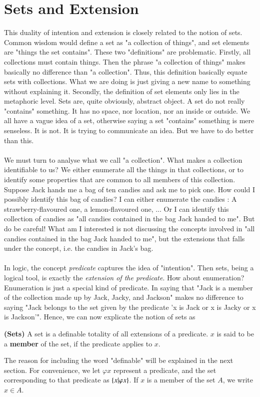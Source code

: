\section{Sets and Extension}
This duality of intention and extension is closely related to the notion of sets. Common wisdom would define a set as "a collection of things", and set elements are "things the set contains". These two "definitions" are problematic. Firstly, all collections must contain things. Then the phrase "a collection of things" makes basically no difference than "a collection". Thus, this definition basically equate sets with collections. What we are doing is just giving a new name to something without explaining it. Secondly, the definition of set elements only lies in the metaphoric level. Sets are, quite obviously, abstract object. A set do not really "contains" something. It has no space, nor location, nor an inside or outside. We all have a vague idea of a set, otherwise saying a set "contains" something is mere senseless. It is not. It is trying to communicate an idea. But we have to do better than this. \\
~\\
We must turn to analyse what we call "a collection". What makes a collection identifiable to us? We either enumerate all the things in that collections, or to identify some properties that are common to all members of this collection. Suppose Jack hands me a bag of ten candies and ask me to pick one. How could I possibly identify this bag of candies? I can either enumerate the candies : A strawberry-flavoured one, a lemon-flavoured one, ... Or I can identify this collection of candies as "all candies contained in the bag Jack handed to me". But do be careful! What am I interested is not discussing the concepts involved in "all candies contained in the bag Jack handed to me", but the extensions that falls under the concept, i.e. the candies in Jack's bag. \\
~\\
In logic, the concept \textit{predicate} captures the idea of "intention". Then sets, being a logical tool, is exactly the \textit{extension of the predicate}. How about enumeration? Enumeration is just a special kind of predicate. In saying that "Jack is a member of the collection made up by Jack, Jacky, and Jackson" makes no difference to saying "Jack belongs to the set given by the predicate 'x is Jack or x is Jacky or x is Jackson'". Hence, we can now explicate the notion of sets as
\begin{defn}
    \textbf{(Sets)} A set is a definable totality of all extensions of a predicate. $x$ is said to be a \textbf{member} of the set, if the predicate applies to $x$.
\end{defn}
The reason for including the word "definable" will be explained in the next section. For convenience, we let $\varphi x$ represent a predicate, and the set corresponding to that predicate as $\{x|\varphi x\}$. If $x$ is a member of the set $A$, we write $x\in A$.\\
~\\

